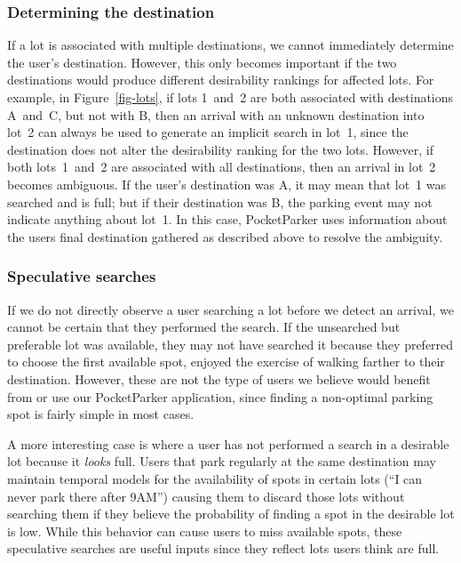 \subsubsection{Determining the destination}

If a lot is associated with multiple destinations, we cannot immediately
determine the user's destination. However, this only becomes important if the
two destinations would produce different desirability rankings for affected
lots. For example, in Figure~\ref{fig-lots}, if lots 1~and~2 are both
associated with destinations A~and~C, but not with B, then an arrival with an
unknown destination into lot~2 can always be used to generate an implicit
search in lot~1, since the destination does not alter the desirability
ranking for the two lots. However, if both lots~1~and~2 are associated with
all destinations, then an arrival in lot~2 becomes ambiguous. If the user's
destination was A, it may mean that lot~1 was searched and is full; but if
their destination was B, the parking event may not indicate anything about
lot~1. In this case, PocketParker uses information about the users final
destination gathered as described above to resolve the ambiguity.

\subsubsection{Speculative searches}

If we do not directly observe a user searching a lot before we detect an
arrival, we cannot be certain that they performed the search. If the unsearched
but preferable lot was available, they may not have searched it because they
preferred to choose the first available spot, enjoyed the exercise of walking
farther to their destination. However, these are not the type of users we
believe would benefit from or use our PocketParker application, since finding a
non-optimal parking spot is fairly simple in most cases.

A more interesting case is where a user has not performed a search in a
desirable lot because it \textit{looks} full. Users that park regularly at
the same destination may maintain temporal models for the availability of
spots in certain lots (``I can never park there after 9AM'') causing them to
discard those lots without searching them if they believe the probability of
finding a spot in the desirable lot is low. While this behavior can cause
users to miss available spots, these speculative searches are useful inputs
since they reflect lots users think are full.

